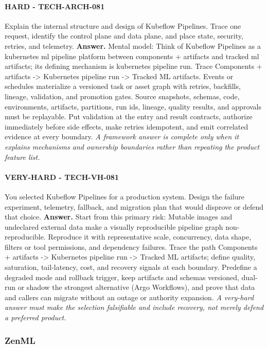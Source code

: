 \paragraph{HARD - TECH-ARCH-081} Explain the internal structure and design of Kubeflow Pipelines. Trace one request, identify the control plane and data plane, and place state, security, retries, and telemetry.
\textbf{Answer.} Mental model: Think of Kubeflow Pipelines as a kubernetes ml pipeline platform between components + artifacts and tracked ml artifacts; its defining mechanism is kubernetes pipeline run. Trace Components + artifacts -> Kubernetes pipeline run -> Tracked ML artifacts. Events or schedules materialize a versioned task or asset graph with retries, backfills, lineage, validation, and promotion gates. Source snapshots, schemas, code, environments, artifacts, partitions, run ids, lineage, quality results, and approvals must be replayable. Put validation at the entry and result contracts, authorize immediately before side effects, make retries idempotent, and emit correlated evidence at every boundary.
\textit{A framework answer is complete only when it explains mechanisms and ownership boundaries rather than repeating the product feature list.}
\paragraph{VERY-HARD - TECH-VH-081} You selected Kubeflow Pipelines for a production system. Design the failure experiment, telemetry, fallback, and migration plan that would disprove or defend that choice.
\textbf{Answer.} Start from this primary risk: Mutable images and undeclared external data make a visually reproducible pipeline graph non-reproducible. Reproduce it with representative scale, concurrency, data shape, filters or tool permissions, and dependency failures. Trace the path Components + artifacts -> Kubernetes pipeline run -> Tracked ML artifacts; define quality, saturation, tail-latency, cost, and recovery signals at each boundary. Predefine a degraded mode and rollback trigger, keep artifacts and schemas versioned, dual-run or shadow the strongest alternative (Argo Workflows), and prove that data and callers can migrate without an outage or authority expansion.
\textit{A very-hard answer must make the selection falsifiable and include recovery, not merely defend a preferred product.}
\subsubsection*{ZenML}
